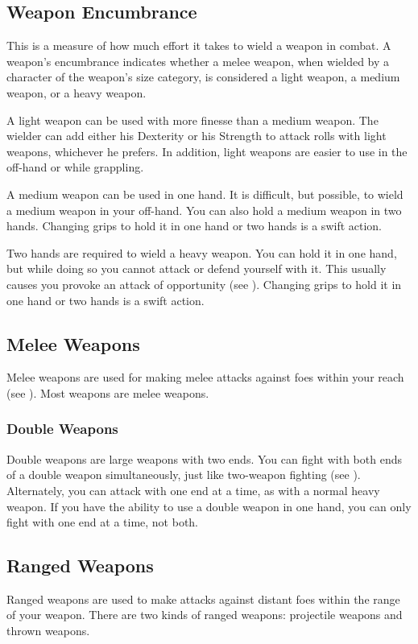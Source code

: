 \subsection{Weapon Encumbrance}
This is a measure of how much effort it takes to wield a weapon in combat. A weapon's encumbrance indicates whether a melee weapon, when wielded by a character of the weapon's size category, is considered a light weapon, a medium weapon, or a heavy weapon.

 A light weapon can be used with more finesse than a medium weapon. The wielder can add either his Dexterity or his Strength to attack rolls with light weapons, whichever he prefers. In addition, light weapons are easier to use in the off-hand or while grappling.

 A medium weapon can be used in one hand. It is difficult, but possible, to wield a medium weapon in your off-hand. You can also hold a medium weapon in two hands. Changing grips to hold it in one hand or two hands is a swift action. 

 Two hands are required to wield a heavy weapon. You can hold it in one hand, but while doing so you cannot attack or defend yourself with it. This usually causes you provoke an attack of opportunity (see ). Changing grips to hold it in one hand or two hands is a swift action.

\subsection{Melee Weapons}
Melee weapons are used for making melee attacks against foes within your reach (see ). Most weapons are melee weapons.

\subsubsection{Double Weapons}
Double weapons are large weapons with two ends. You can fight with both ends of a double weapon simultaneously, just like two-weapon fighting (see ). Alternately, you can attack with one end at a time, as with a normal heavy weapon. If you have the ability to use a double weapon in one hand, you can only fight with one end at a time, not both.

\subsection{Ranged Weapons}
Ranged weapons are used to make attacks against distant foes within the range of your weapon. There are two kinds of ranged weapons: projectile weapons and thrown weapons.

